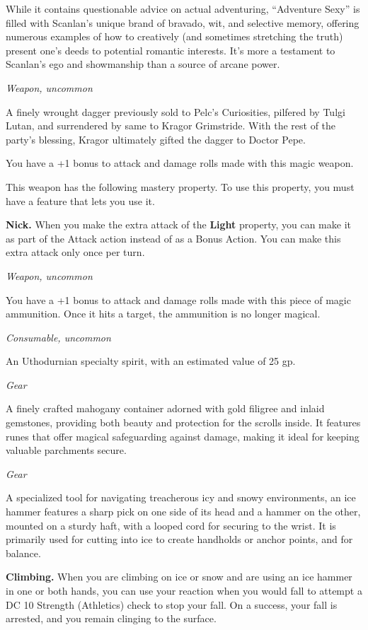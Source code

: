 \documentclass[
  letterpaper,12pt,twoside,twocolumn,openany,
  nodeprecatedcode,bg=full]{dndbook}
\begin{document}
While it contains questionable advice on actual adventuring, ``Adventure
Sexy'' is filled with Scanlan's unique brand of bravado, wit, and
selective memory, offering numerous examples of how to creatively (and
sometimes stretching the truth) present one's deeds to potential
romantic interests. It's more a testament to Scanlan's ego and
showmanship than a source of arcane power.

{\emph{Weapon, uncommon}}

A finely wrought dagger previously sold to Pelc's Curiosities, pilfered
by Tulgi Lutan, and surrendered by same to Kragor Grimstride. With the
rest of the party's blessing, Kragor ultimately gifted the dagger to
Doctor Pepe.

You have a +1 bonus to attack and damage rolls made with this magic
weapon.

This weapon has the following mastery property. To use this property,
you must have a feature that lets you use it.

\textbf{Nick.} When you make the extra attack of the \textbf{Light}
property, you can make it as part of the Attack action instead of as a
Bonus Action. You can make this extra attack only once per turn.

{\emph{Weapon, uncommon}}

You have a +1 bonus to attack and damage rolls made with this piece of
magic ammunition. Once it hits a target, the ammunition is no longer
magical.

{\emph{Consumable, uncommon}}

An Uthodurnian specialty spirit, with an estimated value of 25 gp.

{\emph{Gear}}

A finely crafted mahogany container adorned with gold filigree and
inlaid gemstones, providing both beauty and protection for the scrolls
inside. It features runes that offer magical safeguarding against
damage, making it ideal for keeping valuable parchments secure.

{\emph{Gear}}

A specialized tool for navigating treacherous icy and snowy
environments, an ice hammer features a sharp pick on one side of its
head and a hammer on the other, mounted on a sturdy haft, with a looped
cord for securing to the wrist. It is primarily used for cutting into
ice to create handholds or anchor points, and for balance.

\textbf{Climbing.} When you are climbing on ice or snow and are using an
ice hammer in one or both hands, you can use your reaction when you
would fall to attempt a DC 10 Strength (Athletics) check to stop your
fall. On a success, your fall is arrested, and you remain clinging to
the surface.
\end{document}
